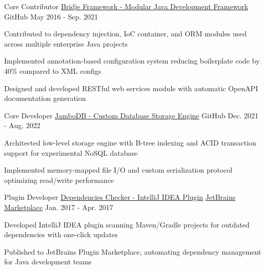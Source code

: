 \begin{cventries}
  \cventry
    {Core Contributor} %
    {\href{https://github.com/touwolf/bridje-framework}{Bridje Framework - Modular Java Development Framework}} %
    {\faGithubSquare\acvHeaderIconSep GitHub} %
    {May 2016 - Sep. 2021} %
    {
      \begin{cvitems} %
        \item {Contributed to dependency injection, IoC container, and ORM modules used across multiple enterprise Java projects}
        \item {Implemented annotation-based configuration system reducing boilerplate code by 40\% compared to XML configs}
        \item {Designed and developed RESTful web services module with automatic OpenAPI documentation generation}
      \end{cvitems}
    }

  \cventry
    {Core Developer} %
    {\href{https://github.com/jambodb/jambodb-storage}{JamboDB - Custom Database Storage Engine}} %
    {\faGithubSquare\acvHeaderIconSep GitHub} %
    {Dec. 2021 - Aug. 2022} %
    {
      \begin{cvitems} %
        \item {Architected low-level storage engine with B-tree indexing and ACID transaction support for experimental NoSQL database}
        \item {Implemented memory-mapped file I/O and custom serialization protocol optimizing read/write performance}
      \end{cvitems}
    }

  \cventry
    {Plugin Developer} %
    {\href{https://github.com/zp1ke/deps-checker}{Dependencies Checker - IntelliJ IDEA Plugin}} %
    {\href{https://plugins.jetbrains.com/plugin/9481-java-dependencies-checker}{JetBrains Marketplace}} %
    {Jan. 2017 - Apr. 2017} %
    {
      \begin{cvitems} %
        \item {Developed IntelliJ IDEA plugin scanning Maven/Gradle projects for outdated dependencies with one-click updates}
        \item {Published to JetBrains Plugin Marketplace, automating dependency management for Java development teams}
      \end{cvitems}
    }


\end{cventries}
